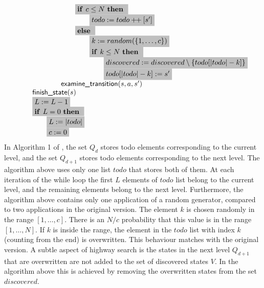 \documentclass{article}
\newcommand{\concat}{\ensuremath{+\!\!+\:}}
\newcommand{\Space}{\text{\ }}
\newcommand{\If}{\text{\textbf{if }}}
\newcommand{\Then}{\text{\textbf{then }}}
\newcommand{\Else}{\text{\textbf{else }}}
\begin{document}
\[\begin{tabular}{l}
\qquad \qquad \qquad \qquad \colorbox{lightgray}{\If $c \leq N$ \Then} \\
\qquad \qquad \qquad \qquad \qquad \colorbox{lightgray}{$todo := todo \concat [s']$} \\
\qquad \qquad \qquad \qquad \colorbox{lightgray}{\Else} \\
\qquad \qquad \qquad \qquad \qquad \colorbox{lightgray}{$k := random(\{ 1, \ldots, c\})$} \\
\qquad \qquad \qquad \qquad \qquad \colorbox{lightgray}{$\If k \leq N \Space \Then$} \\
\qquad \qquad \qquad \qquad \qquad \qquad \colorbox{lightgray}{$discovered := discovered \setminus \{todo[|todo| - k]\}$} \\
\qquad \qquad \qquad \qquad \qquad \qquad \colorbox{lightgray}{$todo[|todo| - k] := s'$} \\
\qquad \qquad \qquad $\textsf{examine\_transition}(s, a, s')$ \\
\qquad $\textsf{finish\_state}(s)$ \\
\qquad \colorbox{lightgray}{$L := L - 1$} \\
\qquad \colorbox{lightgray}{\If $L = 0$ \Then} \\
\qquad \qquad \colorbox{lightgray}{$L := |todo|$} \\
\qquad \qquad \colorbox{lightgray}{$c := 0$}
\end{tabular}
\]
In Algorithm 1 of \cite{DBLP:journals/jlp/EngelsGWW09}, the set $Q_d$ stores todo elements corresponding to the current level, and the set $Q_{d+1}$ stores todo elements corresponding to the next level. The algorithm above uses only one list $todo$ that stores both of them. At each iteration of the while loop the first $L$ elements of $todo$ list belong to the current level, and the remaining elements belong to the next level. Furthermore, the algorithm above contains only one application of a random generator, compared to two applications in the original version. The element $k$ is chosen randomly in the range $[1, \ldots, c]$. There is an $N/c$ probability that this value is in the range $[1, \ldots, N]$. If $k$ is inside the range, the element in the $todo$ list with index $k$ (counting from the end) is overwritten. This behaviour matches with the original version.
A subtle aspect of highway search is the states in the next level $Q_{d+1}$ that are overwritten are not added to the set of discovered states $V$. In the algorithm above this is achieved by removing the overwritten states from the set $discovered$.
\end{document}
